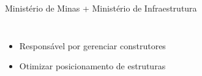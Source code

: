 \documentclass{beamer}
\begin{document}
\begin{frame}{Ministério de Minas + Ministério de Infraestrutura}
\begin{columns}
  \footnotesize{
  \begin{itemize}
    \item Responsável por gerenciar construtores
    \item Otimizar posicionamento de estruturas
  \end{itemize}
  }
\end{columns}
\end{frame}
\end{document}
